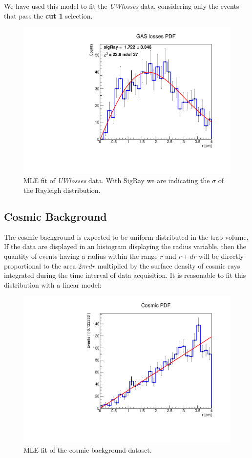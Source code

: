 \documentclass[11pt,a4paper,oneside]{article}
\begin{document}
We have used this model to fit the \textit{UWlosses} data, considering only the events that pass the \textbf{cut 1} selection.
\begin{figure}[hbtp]

\centering
\includegraphics[width = 1\textwidth]{../PlotMLEfit/SingleModel/FitToUw.pdf}
\caption{ MLE fit of \textit{UWlosses} data. With SigRay we are indicating the $\sigma$ of the Rayleigh distribution.}
\end{figure}

\subsection*{Cosmic Background}

The cosmic background is expected to be uniform distributed in the trap volume. If the data are displayed in an histogram displaying the radius variable, then the quantity of events having a radius within the range $r$ and $r + dr$ will be directly proportional to the area $ 2 \pi r dr$ multiplied by the surface density of cosmic rays integrated during the time interval of data acquisition. It is reasonable to fit this distribution with a linear model:

\begin{figure}[hbtp]

\centering
\includegraphics[width = 1\textwidth]{../PlotMLEfit/SingleModel/Cosmici_fit.pdf}
\caption{ MLE fit of the cosmic background dataset.}
\label{fig:CosmicBackground}
\end{figure}
\end{document}
